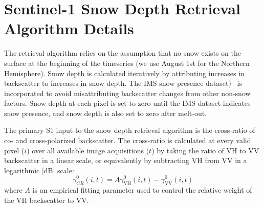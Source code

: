 \documentclass[journal abbreviation, manuscript]{copernicus}
\begin{document}











\appendix
\section{Sentinel-1 Snow Depth Retrieval Algorithm Details}\label{appendix:algorithm}

The retrieval algorithm relies on the assumption that no snow exists on the surface at the beginning of the timeseries (we use August 1st for the Northern Hemisphere). Snow depth is calculated iteratively by attributing increases in backscatter to increases in snow depth. The IMS snow presence dataset)~\citep{NSIDC.2008} is incorporated to avoid misattributing backscatter changes from other non-snow factors. Snow depth at each pixel is set to zero until the IMS dataset indicates snow presence, and snow depth is also set to zero after melt-out. 

The primary S1 input to the snow depth retrieval algorithm is the cross-ratio of co- and cross-polarized backscatter. The cross-ratio is calculated at every valid pixel ($i$) over all available image acquisitions ($t$) by taking the ratio of VH to VV backscatter in a linear scale, or equivalently by subtracting VH from VV in a logarithmic [dB] scale:
\begin{equation} \label{equation:gammaCR}
    \gamma^0_{CR} (i, t) = A \gamma^0_{\mathrm{VH}} (i, t) - \gamma^0_{\mathrm{VV}} (i, t)
\end{equation}
where $A$ is an empirical fitting parameter used to control the relative weight of the VH backscatter to VV. 
\end{document}
